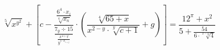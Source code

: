 \documentclass[10pt,a4paper,landscape]{article}
\author{Laura Mia Halászik}
\begin{document}
$$ \sqrt[5]{ x^{y^2}} + \left[ c - \frac{\frac{6^{4} \cdot x_{i}}{\sqrt[6]{x_{n}}}}{\frac{7_{y} \div 15}{\frac{x^{4+y}}{y^{5 \cdot x_{i+j}}}}}     \cdot     \left(  \frac{\sqrt[4]{65+x}}{x^{2-y} \cdot \sqrt[y]{c+1}} + g  \right)    \right]  = \frac{12^\pi + x^2}{5+ \frac{54}{6 \cdot \sqrt[x-y]{4}}}  $$
\end{document}
